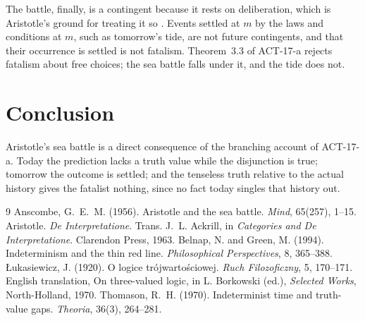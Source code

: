 \documentclass{situationist-preprint}
\begin{document}
The battle, finally, is a contingent because it rests on deliberation, which is Aristotle's ground for treating it so \citep[19a7--9]{AristotleDeInt}. Events settled at $m$ by the laws and conditions at $m$, such as tomorrow's tide, are not future contingents, and that their occurrence is settled is not fatalism. Theorem~3.3 of ACT-17-a rejects fatalism about free choices; the sea battle falls under it, and the tide does not.

\section{Conclusion}

Aristotle's sea battle is a direct consequence of the branching account of ACT-17-a. Today the prediction lacks a truth value while the disjunction is true; tomorrow the outcome is settled; and the tenseless truth relative to the actual history gives the fatalist nothing, since no fact today singles that history out.

\begin{thebibliography}{9}\small
{} Anscombe, G.~E.~M. (1956). Aristotle and the sea battle. \emph{Mind}, 65(257), 1--15.
 Aristotle. \emph{De Interpretatione}. Trans. J.~L. Ackrill, in \emph{Categories and De Interpretatione}. Clarendon Press, 1963.
 Belnap, N. and Green, M. (1994). Indeterminism and the thin red line. \emph{Philosophical Perspectives}, 8, 365--388.
 {\L}ukasiewicz, J. (1920). O logice tr\'ojwarto\'sciowej. \emph{Ruch Filozoficzny}, 5, 170--171. English translation, On three-valued logic, in L. Borkowski (ed.), \emph{Selected Works}, North-Holland, 1970.
 Thomason, R.~H. (1970). Indeterminist time and truth-value gaps. \emph{Theoria}, 36(3), 264--281.
\end{thebibliography}
\end{document}
